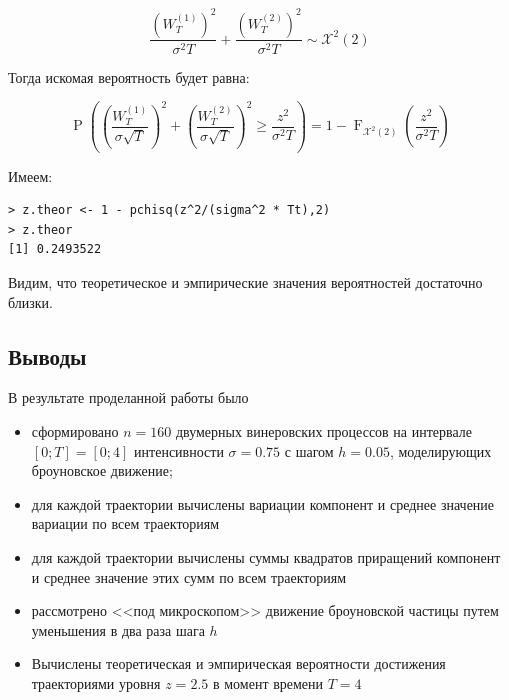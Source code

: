 \documentclass[14pt,a4paper]{scrartcl}
\begin{document}
\begin{equation*}
	\frac{(W^{(1)}_T)^2}{\sigma^2 T}   + \frac{(W^{(2)}_T)^2}{\sigma^2 T}  \sim \mathcal{X}^2(2)
\end{equation*}

Тогда искомая вероятность будет равна:

\begin{equation*}
	\operatorname{P}\left(\left(\frac{W_T^{(1)}}{\sigma\sqrt{T}}\right)^2+\left(\frac{W_T^{(2)}}{\sigma\sqrt{T}}\right)^2 \geq \frac{z^2}{\sigma^2 T}\right) = 1 - \operatorname{F}_{\mathcal{X}^2(2)}\left(\frac{z^2}{\sigma^2 T}\right)
\end{equation*}


Имеем:

\begin{verbatim}
> z.theor <- 1 - pchisq(z^2/(sigma^2 * Tt),2)
> z.theor
[1] 0.2493522
\end{verbatim}

Видим, что теоретическое и эмпирические значения вероятностей достаточно близки.


\pagebreak
\subsection{Выводы}

В результате проделанной работы было

\begin{itemize}
	\item сформировано $n = 160$ двумерных винеровских процессов на интервале $[0;T] = [0;4]$ интенсивности $\sigma = 0.75$ с шагом $h = 0.05$, моделирующих броуновское движение;
	\item для каждой траектории вычислены вариации компонент и среднее значение вариации по всем траекториям
	\item для каждой траектории вычислены суммы квадратов приращений компонент и среднее значение этих сумм по всем траекториям
	\item рассмотрено <<под микроскопом>> движение броуновской частицы путем уменьшения в два раза шага $h$ 
	\item Вычислены теоретическая и эмпирическая вероятности достижения траекториями уровня $z = 2.5$ в момент времени $T = 4$
\end{itemize}
\end{document}
